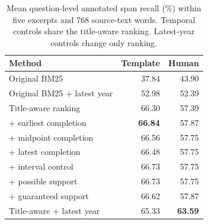 \begin{table}[t]
\centering\small
\begin{tabular}{@{}lrr@{}}
\toprule
Method & Template & Human\\
\midrule
Original BM25 & 37.84 & 43.90\\
Original BM25 + latest year & 52.98 & 52.39\\
Title-aware ranking & 66.30 & 57.39\\
\quad + earliest completion & \textbf{66.84} & 57.87\\
\quad + midpoint completion & 66.56 & 57.75\\
\quad + latest completion & 66.48 & 57.75\\
\quad + interval control & 66.73 & 57.75\\
\quad + possible support & 66.73 & 57.75\\
\quad + guaranteed support & 66.62 & 57.87\\
Title-aware + latest year & 65.33 & \textbf{63.59}\\
\bottomrule
\end{tabular}
\caption{Mean question-level annotated span recall (\%) within five excerpts and 768 source-text words. Temporal controls share the title-aware ranking. Latest-year controls change only ranking.}
\label{tab:matched}
\end{table}
